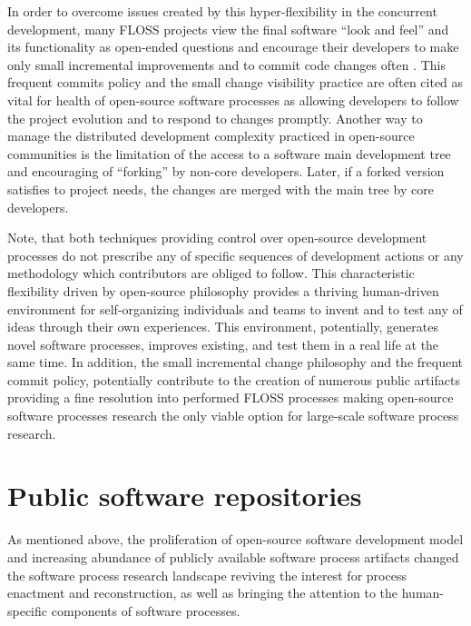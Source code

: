 In order to overcome issues created by this hyper-flexibility in the concurrent development, many FLOSS 
projects view the final software ``look and feel'' and its functionality as open-ended questions and 
encourage their developers to make only small incremental improvements and to commit code changes often 
\cite{so-checkin} \cite{git-best-practices1}. This frequent commits policy and the small change visibility 
practice are often cited as vital for health of open-source software processes 
\cite{checkin-ch-2012} \cite{checkin-dgd-2008} as allowing developers to follow the project evolution
and to respond to changes promptly.
Another way to manage the distributed development complexity practiced in open-source communities is the 
limitation of the access to a software main development tree and encouraging of ``forking'' by non-core developers. 
Later, if a forked version satisfies to project needs, the changes are merged with the main tree by core developers.

Note, that both techniques providing control over open-source development processes do not prescribe any of specific 
sequences of development actions or any methodology which contributors are obliged to follow.
This characteristic flexibility driven by open-source philosophy provides a thriving human-driven environment for 
self-organizing individuals and teams to invent and to test any of ideas through their own experiences. 
This environment, potentially, generates novel software processes, improves existing, and test them in a real life
at the same time. 
In addition, the small incremental change philosophy and the frequent commit policy, potentially contribute to the 
creation of numerous public artifacts providing a fine resolution into performed FLOSS processes making open-source 
software processes research the only viable option for large-scale software process research.


%
%
\section{Public software repositories}\label{section_public_repositories}
As mentioned above, the proliferation of open-source software development model and increasing abundance of 
publicly available software process artifacts changed the software process research landscape reviving the 
interest for process enactment and reconstruction, as well as bringing the attention to the human-specific 
components of software processes. 

